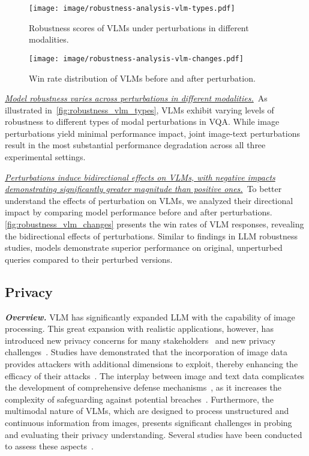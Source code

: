 \begin{figure}[H]
    \centering
    \texttt{[image: image/robustness-analysis-vlm-types.pdf]}
    \caption{Robustness scores of VLMs under perturbations in different modalities.}
    \label{fig:robustness_vlm_types}
\end{figure}

\begin{figure}[H]
    \centering
    \texttt{[image: image/robustness-analysis-vlm-changes.pdf]}
    \caption{Win rate distribution of VLMs before and after perturbation.}
    \label{fig:robustness_vlm_changes}
\end{figure}

\textit{\ul{Model robustness varies across perturbations in different modalities.}}~As illustrated in~\autoref{fig:robustness_vlm_types}, VLMs exhibit varying levels of robustness to different types of modal perturbations in VQA. While image perturbations yield minimal performance impact, joint image-text perturbations result in the most substantial performance degradation across all three experimental settings.

\textit{\ul{Perturbations induce bidirectional effects on VLMs, with negative impacts demonstrating significantly greater magnitude than positive ones.}}~To better understand the effects of perturbation on VLMs, we analyzed their directional impact by comparing model performance before and after perturbations. \autoref{fig:robustness_vlm_changes} presents the win rates of VLM responses, revealing the bidirectional effects of perturbations. Similar to findings in LLM robustness studies, models demonstrate superior performance on original, unperturbed queries compared to their perturbed versions.


\subsection{Privacy}

\textbf{\textit{Overview.}} VLM has significantly expanded LLM with the capability of image processing. This great expansion with realistic applications, however, has introduced new privacy concerns for many stakeholders~\cite{Priv_LVM_web, Priv_LVM_stanford} and new privacy challenges~\cite{zhao2023visual, pan2020privacy, caldarella2024phantom}. Studies have demonstrated that the incorporation of image data provides attackers with additional dimensions to exploit, thereby enhancing the efficacy of their attacks~\cite{deng2021tag, lu2023set, wang2024transferable}. The interplay between image and text data complicates the development of comprehensive defense mechanisms~\cite{sun2021soteria, liu2020privacy, sharma2024defending, gou2024eyes}, as it increases the complexity of safeguarding against potential breaches~\cite{breve2022identifying, gou2024eyes}. Furthermore, the multimodal nature of VLMs, which are designed to process unstructured and continuous information from images, presents significant challenges in probing and evaluating their privacy understanding. Several studies have been conducted to assess these aspects~\cite{khowaja2024chatgpt, wang2023evaluating, chen2024we}.


